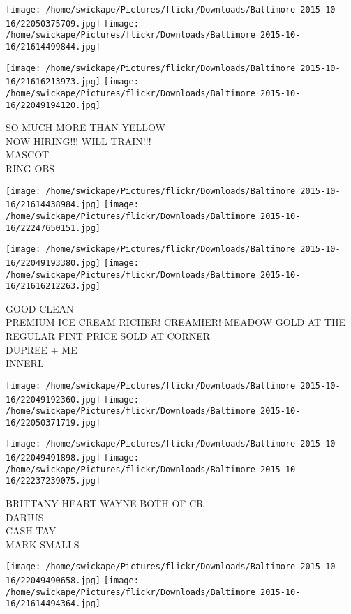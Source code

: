 \documentclass[10pt,letterpaper]{article}
\begin{document}
\texttt{[image: /home/swickape/Pictures/flickr/Downloads/Baltimore 2015-10-16/22050375709.jpg]}
\texttt{[image: /home/swickape/Pictures/flickr/Downloads/Baltimore 2015-10-16/21614499844.jpg]}

\texttt{[image: /home/swickape/Pictures/flickr/Downloads/Baltimore 2015-10-16/21616213973.jpg]}
\texttt{[image: /home/swickape/Pictures/flickr/Downloads/Baltimore 2015-10-16/22049194120.jpg]}

SO MUCH MORE THAN YELLOW\\
NOW HIRING!!! WILL TRAIN!!!\\
MASCOT\\
RING OBS\\
\pagebreak

\texttt{[image: /home/swickape/Pictures/flickr/Downloads/Baltimore 2015-10-16/21614438984.jpg]}
\texttt{[image: /home/swickape/Pictures/flickr/Downloads/Baltimore 2015-10-16/22247650151.jpg]}

\texttt{[image: /home/swickape/Pictures/flickr/Downloads/Baltimore 2015-10-16/22049193380.jpg]}
\texttt{[image: /home/swickape/Pictures/flickr/Downloads/Baltimore 2015-10-16/21616212263.jpg]}

GOOD CLEAN\\
PREMIUM ICE CREAM RICHER! CREAMIER! MEADOW GOLD AT THE REGULAR PINT PRICE SOLD AT CORNER\\
DUPREE + ME\\
INNERL\\
\pagebreak

\texttt{[image: /home/swickape/Pictures/flickr/Downloads/Baltimore 2015-10-16/22049192360.jpg]}
\texttt{[image: /home/swickape/Pictures/flickr/Downloads/Baltimore 2015-10-16/22050371719.jpg]}

\texttt{[image: /home/swickape/Pictures/flickr/Downloads/Baltimore 2015-10-16/22049491898.jpg]}
\texttt{[image: /home/swickape/Pictures/flickr/Downloads/Baltimore 2015-10-16/22237239075.jpg]}

BRITTANY HEART WAYNE BOTH OF CR\\
DARIUS\\
CASH TAY\\
MARK SMALLS\\
\pagebreak

\texttt{[image: /home/swickape/Pictures/flickr/Downloads/Baltimore 2015-10-16/22049490658.jpg]}
\texttt{[image: /home/swickape/Pictures/flickr/Downloads/Baltimore 2015-10-16/21614494364.jpg]}
\end{document}
